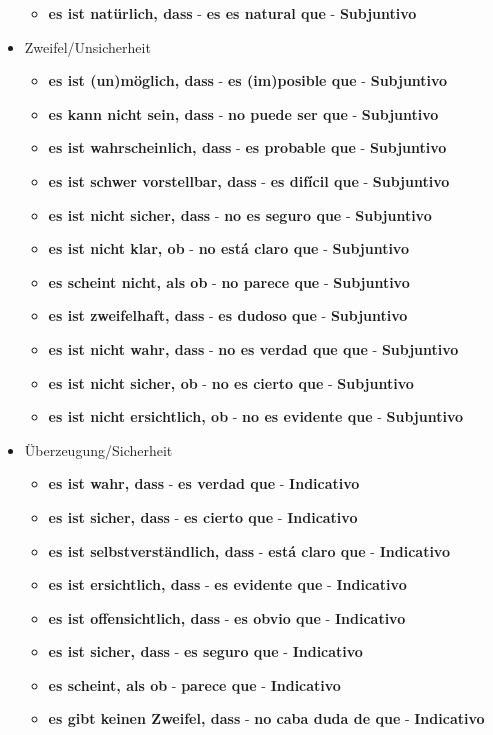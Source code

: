 \documentclass{article}
\begin{document}
\begin{multicols}{2}
\begin{itemize}
\begin{itemize}
			\item{\textbf{es ist natürlich, dass} - \textbf{es es natural que} - \textbf{Subjuntivo}}
		\end{itemize}
		\item{Zweifel/Unsicherheit}
		\begin{itemize}
			\item{\textbf{es ist (un)möglich, dass} - \textbf{es (im)posible que} - \textbf{Subjuntivo}}
			\item{\textbf{es kann nicht sein, dass} - \textbf{no puede ser que} - \textbf{Subjuntivo}}
			\item{\textbf{es ist wahrscheinlich, dass} - \textbf{es probable que} - \textbf{Subjuntivo}}
			\item{\textbf{es ist schwer vorstellbar, dass} - \textbf{es difícil que} - \textbf{Subjuntivo}}
			\item{\textbf{es ist nicht sicher, dass} - \textbf{no es seguro que} - \textbf{Subjuntivo}}
			\item{\textbf{es ist nicht klar, ob} - \textbf{no está claro que} - \textbf{Subjuntivo}}
			\item{\textbf{es scheint nicht, als ob} - \textbf{no parece que} - \textbf{Subjuntivo}}
			\item{\textbf{es ist zweifelhaft, dass} - \textbf{es dudoso que} - \textbf{Subjuntivo}}
			\item{\textbf{es ist nicht wahr, dass} - \textbf{no es verdad que que} - \textbf{Subjuntivo}}
			\item{\textbf{es ist nicht sicher, ob} - \textbf{no es cierto que} - \textbf{Subjuntivo}}
			\item{\textbf{es ist nicht ersichtlich, ob} - \textbf{no es evidente que} - \textbf{Subjuntivo}}

		\end{itemize}
		\item{Überzeugung/Sicherheit}
		\begin{itemize}
			\item{\textbf{es ist wahr, dass} - \textbf{es verdad que} - \textbf{Indicativo}}
			\item{\textbf{es ist sicher, dass} - \textbf{es cierto que} - \textbf{Indicativo}}
			\item{\textbf{es ist selbstverständlich, dass} - \textbf{está claro que} - \textbf{Indicativo}}
			\item{\textbf{es ist ersichtlich, dass} - \textbf{es evidente que} - \textbf{Indicativo}}
			\item{\textbf{es ist offensichtlich, dass} - \textbf{es obvio que} - \textbf{Indicativo}}
			\item{\textbf{es ist sicher, dass} - \textbf{es seguro que} - \textbf{Indicativo}}
			\item{\textbf{es scheint, als ob} - \textbf{parece que} - \textbf{Indicativo}}
			\item{\textbf{es gibt keinen Zweifel, dass} - \textbf{no caba duda de que} - \textbf{Indicativo}}	
		\end{itemize}
	\end{itemize}
	
		\end{multicols}
	
\end{document}
